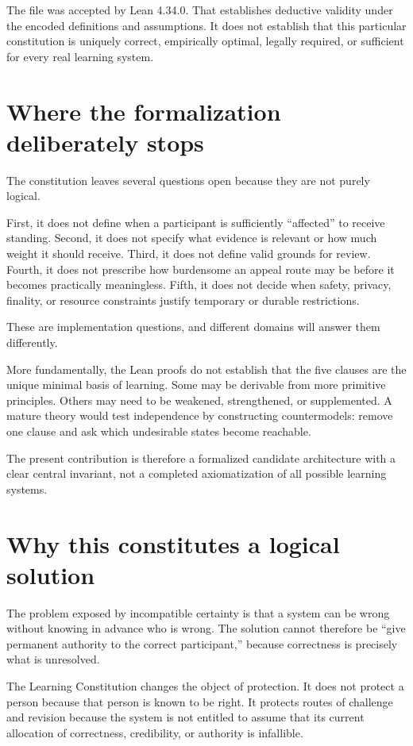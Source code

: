 \documentclass[11pt,a4paper]{article}
\begin{document}
The file was accepted by Lean 4.34.0. That establishes deductive validity under the encoded definitions and assumptions. It does not establish that this particular constitution is uniquely correct, empirically optimal, legally required, or sufficient for every real learning system.

\section{Where the formalization deliberately stops}

The constitution leaves several questions open because they are not purely logical.

First, it does not define when a participant is sufficiently ``affected'' to receive standing. Second, it does not specify what evidence is relevant or how much weight it should receive. Third, it does not define valid grounds for review. Fourth, it does not prescribe how burdensome an appeal route may be before it becomes practically meaningless. Fifth, it does not decide when safety, privacy, finality, or resource constraints justify temporary or durable restrictions.

These are implementation questions, and different domains will answer them differently.

More fundamentally, the Lean proofs do not establish that the five clauses are the unique minimal basis of learning. Some may be derivable from more primitive principles. Others may need to be weakened, strengthened, or supplemented. A mature theory would test independence by constructing countermodels: remove one clause and ask which undesirable states become reachable.

The present contribution is therefore a formalized candidate architecture with a clear central invariant, not a completed axiomatization of all possible learning systems.

\section{Why this constitutes a logical solution}

The problem exposed by incompatible certainty is that a system can be wrong without knowing in advance who is wrong. The solution cannot therefore be ``give permanent authority to the correct participant,'' because correctness is precisely what is unresolved.

The Learning Constitution changes the object of protection. It does not protect a person because that person is known to be right. It protects routes of challenge and revision because the system is not entitled to assume that its current allocation of correctness, credibility, or authority is infallible.
\end{document}
